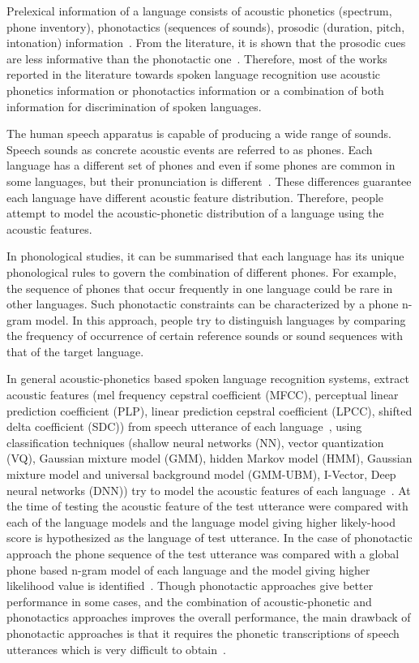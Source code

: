 \begin{spacing}{1.5}
Prelexical information of a language consists of acoustic phonetics (spectrum, phone inventory), phonotactics (sequences of sounds), prosodic (duration, pitch, intonation) information~\cite{li2013spoken}. From the literature, it is shown that the prosodic cues are less informative than the phonotactic one~\cite{ramus1999language,navratil2001spoken}. Therefore, most of the works reported in the literature towards spoken language recognition use acoustic phonetics information or phonotactics information or a combination of both information for discrimination of spoken languages.  

The human speech apparatus is capable of producing a wide range of sounds. Speech sounds as concrete acoustic events are referred to as phones. Each language has a different set of phones and even if some phones are common in some languages, but their pronunciation is different~\cite{li2013spoken}. These differences guarantee each language have different acoustic feature distribution. Therefore, people attempt to model the acoustic-phonetic distribution of a language using the acoustic features. 

In phonological studies, it can be summarised that each language has its unique phonological rules to govern the combination of different phones. For example, the sequence of phones that occur frequently in one language could be rare in other languages. Such phonotactic constraints can be characterized by a phone n-gram model. In this approach, people try to distinguish languages by comparing the frequency of occurrence of certain reference sounds or sound sequences with that of the target language.

In general acoustic-phonetics based spoken language recognition systems, extract acoustic features (mel frequency cepstral coefficient (MFCC), perceptual linear prediction coefficient (PLP), linear prediction cepstral coefficient (LPCC), shifted delta coefficient (SDC)) from speech utterance of each language~\cite{rabiner1993yegnanarayana,hermansky1990perceptual,torres2002approaches}, using classification techniques (shallow neural networks (NN), vector quantization (VQ), Gaussian mixture model (GMM), hidden Markov model (HMM), Gaussian mixture model and universal background model (GMM-UBM), I-Vector, Deep neural networks (DNN)) try to model the acoustic features of each language~\cite{wong2002methods,zissman1996comparison,zissman1993automatic,sugiyama1991automatic,braun1998automatic,richardson2015deep}. At the time of testing the acoustic feature of the test utterance were compared with each of the language models and the language model giving higher likely-hood score is hypothesized as the language of test utterance. In the case of phonotactic approach the phone sequence of the test utterance was compared with a global phone based n-gram model of each language and the model giving higher likelihood value is identified~\cite{jurafsky2000speech}. Though phonotactic approaches give better performance in some cases, and the combination of acoustic-phonetic and phonotactics approaches improves the overall performance, the main drawback of phonotactic approaches is that it requires the phonetic transcriptions of speech utterances which is very difficult to obtain~\cite{li2013spoken}.


\end{spacing}
